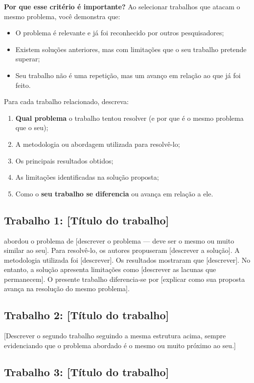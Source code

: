 \documentclass[
    12pt,                %
    openright,           %
    oneside,             %
    a4paper,             %
    english,             %
    brazil               %
]{abntex2}
\begin{document}
\textbf{Por que esse critério é importante?} Ao selecionar trabalhos que atacam o mesmo problema, você demonstra que:
\begin{itemize}
    \item O problema é relevante e já foi reconhecido por outros pesquisadores;
    \item Existem soluções anteriores, mas com limitações que o seu trabalho pretende superar;
    \item Seu trabalho não é uma repetição, mas um avanço em relação ao que já foi feito.
\end{itemize}

Para cada trabalho relacionado, descreva:
\begin{enumerate}
    \item \textbf{Qual problema} o trabalho tentou resolver (e por que é o mesmo problema que o seu);
    \item A metodologia ou abordagem utilizada para resolvê-lo;
    \item Os principais resultados obtidos;
    \item As limitações identificadas na solução proposta;
    \item Como o \textbf{seu trabalho se diferencia} ou avança em relação a ele.
\end{enumerate}

\subsection{Trabalho 1: [Título do trabalho]}

 abordou o problema de [descrever o problema --- deve ser o mesmo ou muito similar ao seu]. Para resolvê-lo, os autores propuseram [descrever a solução]. A metodologia utilizada foi [descrever]. Os resultados mostraram que [descrever]. No entanto, a solução apresenta limitações como [descrever as lacunas que permanecem]. O presente trabalho diferencia-se por [explicar como sua proposta avança na resolução do mesmo problema].

\subsection{Trabalho 2: [Título do trabalho]}

[Descrever o segundo trabalho seguindo a mesma estrutura acima, sempre evidenciando que o problema abordado é o mesmo ou muito próximo ao seu.]

\subsection{Trabalho 3: [Título do trabalho]}
\end{document}
